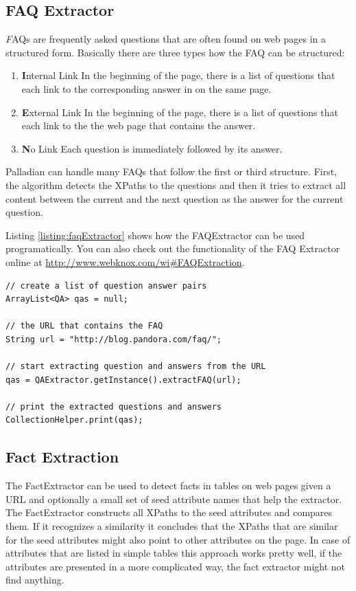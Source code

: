 \documentclass[a4paper,twoside]{book}      %
\begin{document}
\subsection{FAQ Extractor}
{\textit FAQs} are frequently asked questions that are often found on web pages in a structured form. Basically there are three types how the FAQ can be structured:
\begin{enumerate}
\item {\textbf Internal Link} In the beginning of the page, there is a list of questions that each link to the corresponding answer in on the same page.
\item {\textbf External Link} In the beginning of the page, there is a list of questions that each link to the the web page that contains the answer.
\item {\textbf No Link} Each question is immediately followed by its answer.
\end{enumerate}

Palladian can handle many FAQs that follow the first or third structure. First, the algorithm detects the XPaths to the questions and then it tries to extract all content between the current and the next question as the answer for the current question.

Listing \ref{listing:faqExtractor} shows how the FAQExtractor can be used programatically. You can also check out the functionality of the FAQ Extractor online at \url{http://www.webknox.com/wi#FAQExtraction}.

\begin{codelisting}
\begin{lstlisting}[label=listing:faqExtractor,caption=Extract an FAQ from a web page.,frame=tb]
// create a list of question answer pairs
ArrayList<QA> qas = null;

// the URL that contains the FAQ
String url = "http://blog.pandora.com/faq/";

// start extracting question and answers from the URL
qas = QAExtractor.getInstance().extractFAQ(url);

// print the extracted questions and answers
CollectionHelper.print(qas);
\end{lstlisting}
\end{codelisting}

\subsection{Fact Extraction}
The FactExtractor can be used to detect facts in tables on web pages given a URL and optionally a small set of seed attribute names that help the extractor. The FactExtractor constructs all XPaths to the seed attributes and compares them. If it recognizes a similarity it concludes that the XPaths that are similar for the seed attributes might also point to other attributes on the page. In case of attributes that are listed in simple tables this approach works pretty well, if the attributes are presented in a more complicated way, the fact extractor might not find anything.
\end{document}
